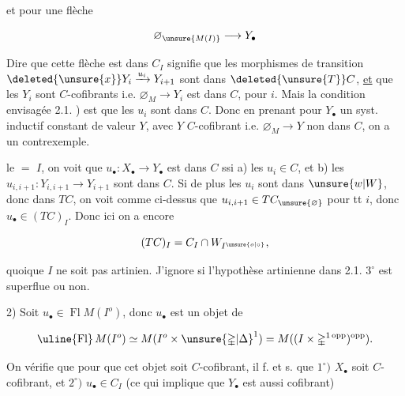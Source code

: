 
et pour une flèche

\[
 \varnothing_{\unsure{M(I)}}\longrightarrow Y_\bullet
\]

Dire que cette flèche est dans $C_I$ signifie que les morphismes de transition $\deleted{\unsure{x}}Y_i\xrightarrow{u_i}Y_{i+1}$ sont dans $\deleted{\unsure{T}}C$, \uline{et} que les $Y_i$ sont $C$-cofibrants i.e. $\varnothing_M\longrightarrow Y_i$ est dans $C$, pour  $i$. Mais la condition envisagée  2.1. ) est  que les $u_i$ sont dans $C$. Donc en prenant pour $Y_\bullet$ un syst. inductif constant de valeur $Y$, avec $Y$  $C$-cofibrant i.e. $\varnothing_M\longrightarrow Y$ non dans $C$, on a un contrexemple.

 le $=$ $I$, on voit que $u_\bullet:X_\bullet\longrightarrow Y_\bullet$ est dans $C$ ssi a) les $u_i\in C$, et b) les $u_{i,i+1}:Y_{i,i+1}\longrightarrow Y_{i+1}$ sont dans $C$. Si de plus les $u_i$ sont dans $\unsure{w|W}$, donc dans $TC$, on voit comme ci-dessus que $u_{i,i+1}\in TC_{\unsure{\varnothing}}$ pour tt $i$, donc $u_\bullet\in(TC)_I$. Donc ici on a encore

\[
 (TC)_I=C_I\cap W_{I^{\unsure{o|\circ}}},
\]

quoique $I$ ne soit pas artinien. J'ignore si l'hypothèse artinienne dans 2.1. $3^\circ$ est superflue ou non.

2) Soit $u_\bullet\in\operatorname{Fl}M(I^o)$, donc $u_\bullet$ est un objet de

\[
 \text{\uline{Fl}}\,M(I^o)\simeq M(I^o\times\unsure{\mathbb{\Delta}|\Delta}^{1})=M((I\times\mathbb{\Delta}^{1\,\mathrm{opp}})^{\mathrm{opp}}).
\]

 On vérifie que pour que cet objet soit $C$-cofibrant, il f. et s. que $1^\circ)$ $X_\bullet$ soit $C$-cofibrant, et $2^\circ)$ $u_\bullet\in C_I$ (ce qui implique que $Y_\bullet$ est aussi cofibrant)




